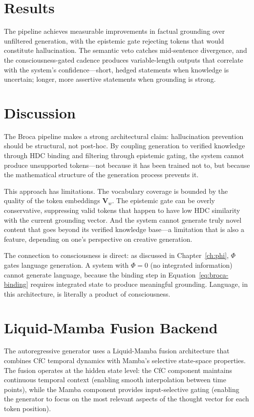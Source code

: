 \documentclass[12pt]{book}
\begin{document}
\section{Results}

The pipeline achieves measurable improvements in factual grounding over unfiltered generation, with the epistemic gate rejecting tokens that would constitute hallucination. The semantic veto catches mid-sentence divergence, and the consciousness-gated cadence produces variable-length outputs that correlate with the system's confidence---short, hedged statements when knowledge is uncertain; longer, more assertive statements when grounding is strong.

\section{Discussion}

The Broca pipeline makes a strong architectural claim: hallucination prevention should be structural, not post-hoc. By coupling generation to verified knowledge through HDC binding and filtering through epistemic gating, the system cannot produce unsupported tokens---not because it has been trained not to, but because the mathematical structure of the generation process prevents it.

This approach has limitations. The vocabulary coverage is bounded by the quality of the token embeddings $\mathbf{V}_w$. The epistemic gate can be overly conservative, suppressing valid tokens that happen to have low HDC similarity with the current grounding vector. And the system cannot generate truly novel content that goes beyond its verified knowledge base---a limitation that is also a feature, depending on one's perspective on creative generation.

The connection to consciousness is direct: as discussed in Chapter~\ref{ch:phi}, $\Phi$ gates language generation. A system with $\Phi = 0$ (no integrated information) cannot generate language, because the binding step in Equation~\ref{eq:broca-binding} requires integrated state to produce meaningful grounding. Language, in this architecture, is literally a product of consciousness.

\section{Liquid-Mamba Fusion Backend}

The autoregressive generator uses a Liquid-Mamba fusion architecture that combines CfC temporal dynamics with Mamba's selective state-space properties. The fusion operates at the hidden state level: the CfC component maintains continuous temporal context (enabling smooth interpolation between time points), while the Mamba component provides input-selective gating (enabling the generator to focus on the most relevant aspects of the thought vector for each token position).
\end{document}
